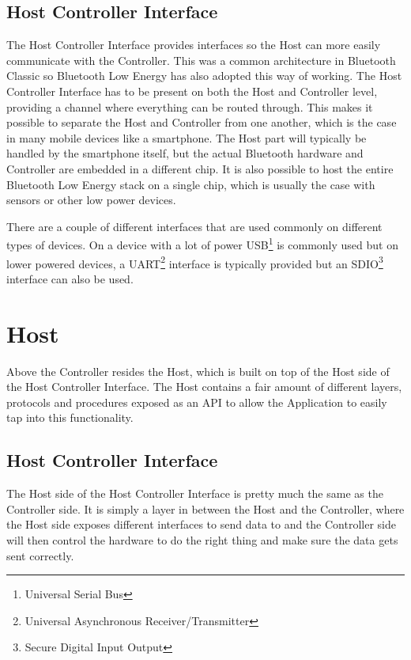\documentclass[pdftex,a4paper,12pt,twoside]{report}
\begin{document}
\subsection{Host Controller Interface}
\label{subsec:controllerHCI}
The Host Controller Interface provides interfaces so the Host can more easily communicate with the Controller. This was a common architecture in Bluetooth Classic so Bluetooth Low Energy has also adopted this way of working. The Host Controller Interface has to be present on both the Host and Controller level, providing a channel where everything can be routed through. This makes it possible to separate the Host and Controller from one another, which is the case in many mobile devices like a smartphone. The Host part will typically be handled by the smartphone itself, but the actual Bluetooth hardware and Controller are embedded in a different chip. It is also possible to host the entire Bluetooth Low Energy stack on a single chip, which is usually the case with sensors or other low power devices.

There are a couple of different interfaces that are used commonly on different types of devices. On a device with a lot of power  USB\footnote{Universal Serial Bus} is commonly used but on lower powered devices, a UART\footnote{Universal Asynchronous Receiver/Transmitter} interface is typically provided but an SDIO\footnote{Secure Digital Input Output} interface can also be used.

\section{Host}
\label{sec:stackHost}
Above the Controller resides the Host, which is built on top of the Host side of the Host Controller Interface. The Host contains a fair amount of different layers, protocols and procedures exposed as an API to allow the Application to easily tap into this functionality.

\subsection{Host Controller Interface}
\label{subsec:hostHCI}
The Host side of the Host Controller Interface is pretty much the same as the Controller side. It is simply a layer in between the Host and the Controller, where the Host side exposes different interfaces to send data to and the Controller side will then control the hardware to do the right thing and make sure the data gets sent correctly.
\end{document}
